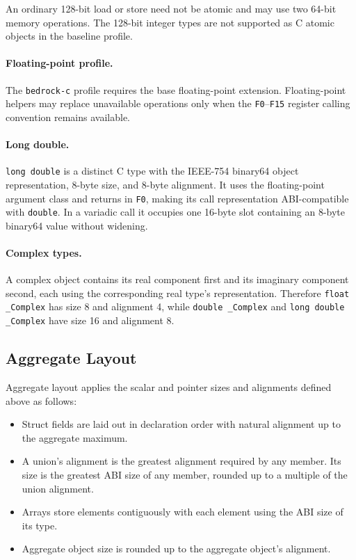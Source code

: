 \documentclass[10pt,twoside]{article}
\begin{document}
An ordinary 128-bit load or store need not be atomic and may use two 64-bit
memory operations. The 128-bit integer types are not supported as C atomic
objects in the baseline profile.

\paragraph{Floating-point profile.}
The \texttt{bedrock-c} profile requires the base floating-point extension.
Floating-point helpers may replace
unavailable operations only when the \texttt{F0}--\texttt{F15} register calling
convention remains available.

\paragraph{Long double.}
\texttt{long double} is a distinct C type with the IEEE-754 binary64 object
representation, 8-byte size, and 8-byte alignment. It uses the floating-point
argument class and returns in \texttt{F0}, making its call representation
ABI-compatible with \texttt{double}. In a variadic call it occupies one
16-byte slot containing an 8-byte binary64 value without widening.

\paragraph{Complex types.}
A complex object contains its real component first and its imaginary component
second, each using the corresponding real type's representation. Therefore
\texttt{float \_Complex} has size 8 and alignment 4, while
\texttt{double \_Complex} and \texttt{long double \_Complex} have size 16 and
alignment 8.

\subsection{Aggregate Layout}
Aggregate layout applies the scalar and pointer sizes and alignments defined
above as follows:
\begin{itemize}
\item Struct fields are laid out in declaration order with natural alignment up to the aggregate maximum.
\item A union's alignment is the greatest alignment required by any member. Its size is the greatest ABI size of any
member, rounded up to a multiple of the union alignment.
\item Arrays store elements contiguously with each element using the ABI size of its type.
\item Aggregate object size is rounded up to the aggregate object's alignment.
\end{itemize}
\end{document}
